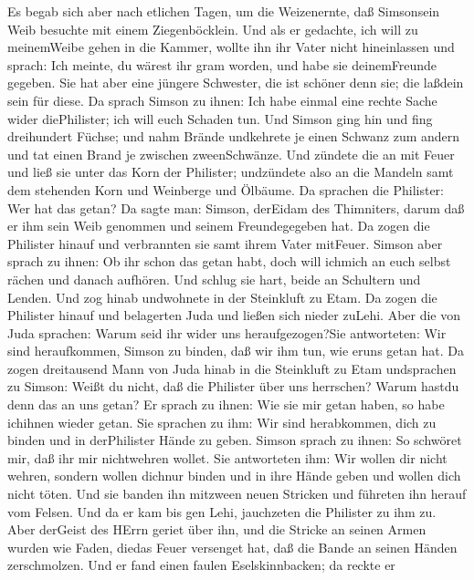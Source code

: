  Es begab sich aber nach etlichen Tagen, um die Weizenernte,
daß Simsonsein Weib besuchte mit einem Ziegenböcklein. Und als er
gedachte, ich will zu meinemWeibe gehen in die Kammer, wollte ihn ihr
Vater nicht hineinlassen  und sprach: Ich meinte, du wärest
ihr gram worden, und habe sie deinemFreunde gegeben. Sie hat aber eine
jüngere Schwester, die ist schöner denn sie; die laßdein sein für diese.
 Da sprach Simson zu ihnen: Ich habe einmal eine rechte
Sache wider diePhilister; ich will euch Schaden tun.  Und
Simson ging hin und fing dreihundert Füchse; und nahm Brände undkehrete
je einen Schwanz zum andern und tat einen Brand je zwischen
zweenSchwänze.  Und zündete die an mit Feuer und ließ sie
unter das Korn der Philister; undzündete also an die Mandeln samt dem
stehenden Korn und Weinberge und Ölbäume.  Da sprachen die
Philister: Wer hat das getan? Da sagte man: Simson, derEidam des
Thimniters, darum daß er ihm sein Weib genommen und seinem
Freundegegeben hat. Da zogen die Philister hinauf und verbrannten sie
samt ihrem Vater mitFeuer.  Simson aber sprach zu ihnen: Ob
ihr schon das getan habt, doch will ichmich an euch selbst rächen und
danach aufhören.  Und schlug sie hart, beide an Schultern
und Lenden. Und zog hinab undwohnete in der Steinkluft zu Etam.
 Da zogen die Philister hinauf und belagerten Juda und
ließen sich nieder zuLehi.  Aber die von Juda sprachen:
Warum seid ihr wider uns heraufgezogen?Sie antworteten: Wir sind
heraufkommen, Simson zu binden, daß wir ihm tun, wie eruns getan hat.
 Da zogen dreitausend Mann von Juda hinab in die Steinkluft
zu Etam undsprachen zu Simson: Weißt du nicht, daß die Philister über
uns herrschen? Warum hastdu denn das an uns getan? Er sprach zu ihnen:
Wie sie mir getan haben, so habe ichihnen wieder getan. 
Sie sprachen zu ihm: Wir sind herabkommen, dich zu binden und in
derPhilister Hände zu geben. Simson sprach zu ihnen: So schwöret mir,
daß ihr mir nichtwehren wollet.  Sie antworteten ihm: Wir
wollen dir nicht wehren, sondern wollen dichnur binden und in ihre Hände
geben und wollen dich nicht töten. Und sie banden ihn mitzween neuen
Stricken und führeten ihn herauf vom Felsen.  Und da er kam
bis gen Lehi, jauchzeten die Philister zu ihm zu. Aber derGeist des
HErrn geriet über ihn, und die Stricke an seinen Armen wurden wie Faden,
diedas Feuer versenget hat, daß die Bande an seinen Händen zerschmolzen.
 Und er fand einen faulen Eselskinnbacken; da reckte er
